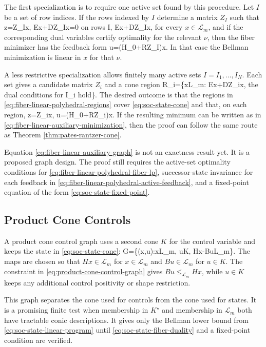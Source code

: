 \documentclass{article}
\begin{document}
The first specialization is to require one active set found by this procedure. Let $I$ be a set of row indices. If the rows indexed by $I$ determine a matrix $Z_I$ such that
\BEQ
z=Z_Ix,
\quad
Ex+DZ_Ix=0 \textrm{ on rows } I,
\quad
Ex+DZ_Ix,
\label{eq:fiber-linear-polyhedral-fixed-active-set}
\EEQ
for every $x\in\mathcal L_m$, and if the corresponding dual variables certify optimality for the relevant $\nu$, then the fiber minimizer has the feedback form
\BEQ
u=(H_0+RZ_I)x.
\label{eq:fiber-linear-polyhedral-fixed-feedback}
\EEQ
In that case the Bellman minimization is linear in $x$ for that $\nu$.

A less restrictive specialization allows finitely many active sets $I=I_1,\ldots,I_N$. Each set gives a candidate matrix $Z_i$ and a cone region
\BEQ
\mathcal R_i=\{x\in\mathcal L_m: Ex+DZ_ix,
\quad \textrm{the dual conditions for } I_i \textrm{ hold}\}.
\label{eq:fiber-linear-polyhedral-regions}
\EEQ
The desired outcome is that the regions in \eqref{eq:fiber-linear-polyhedral-regions} cover \eqref{eq:soc-state-cone} and that, on each region,
\BEQ
z=Z_ix,
\quad
u=(H_0+RZ_i)x.
\label{eq:fiber-linear-polyhedral-active-feedback}
\EEQ
If the resulting minimum can be written as in \eqref{eq:fiber-linear-auxiliary-minimization}, then the proof can follow the same route as Theorem \ref{thm:pates-rantzer-cone}.

Equation \eqref{eq:fiber-linear-auxiliary-graph} is not an exactness result yet. It is a proposed graph design. The proof still requires the active-set optimality conditions for \eqref{eq:fiber-linear-polyhedral-fiber-lp}, successor-state invariance for each feedback in \eqref{eq:fiber-linear-polyhedral-active-feedback}, and a fixed-point equation of the form \eqref{eq:soc-state-fixed-point}.
\subsection{Product Cone Controls}

A product cone control graph uses a second cone $K$ for the control variable and keeps the state in \eqref{eq:soc-state-cone}:
\BEQ
G=\{(x,u):x\in\mathcal L_m,
u\in K,
Hx-Bu\in\mathcal L_m\}.
\label{eq:product-cone-control-graph}
\EEQ
The maps are chosen so that $Hx\in\mathcal L_m$ for $x\in\mathcal L_m$ and $Bu\in\mathcal L_m$ for $u\in K$. The constraint in \eqref{eq:product-cone-control-graph} gives $Bu\leq_{\mathcal L_m}Hx$, while $u\in K$ keeps any additional control positivity or shape restriction.

This graph separates the cone used for controls from the cone used for states. It is a promising finite test when membership in $K^\star$ and membership in $\mathcal L_m$ both have tractable conic descriptions. It gives only the Bellman lower bound from \eqref{eq:soc-state-linear-program} until \eqref{eq:soc-state-fiber-duality} and a fixed-point condition are verified.
\end{document}
